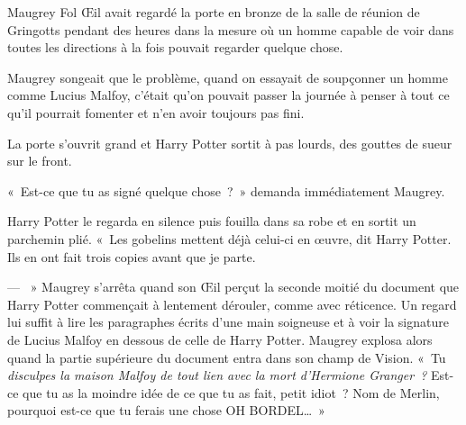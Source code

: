 \later

Maugrey Fol Œil avait regardé la porte en bronze de la salle de réunion de Gringotts pendant des heures dans la mesure où un homme capable de voir dans toutes les directions à la fois pouvait regarder quelque chose.

Maugrey songeait que le problème, quand on essayait de soupçonner un homme comme Lucius Malfoy, c'était qu'on pouvait passer la journée à penser à tout ce qu'il pourrait fomenter et n'en avoir toujours pas fini.

La porte s'ouvrit grand et Harry Potter sortit à pas lourds, des gouttes de sueur sur le front.

«~Est-ce que tu as signé quelque chose~?~» demanda immédiatement Maugrey.

Harry Potter le regarda en silence puis fouilla dans sa robe et en sortit un parchemin plié. «~Les gobelins mettent déjà celui-ci en œuvre, dit Harry Potter. Ils en ont fait trois copies avant que je parte.

--- ~» Maugrey s'arrêta quand son Œil perçut la seconde moitié du document que Harry Potter commençait à lentement dérouler, comme avec réticence. Un regard lui suffit à lire les paragraphes écrits d'une main soigneuse et à voir la signature de Lucius Malfoy en dessous de celle de Harry Potter. Maugrey explosa alors quand la partie supérieure du document entra dans son champ de Vision. «~Tu \emph{disculpes la maison Malfoy de tout lien avec la mort d'Hermione Granger~?} Est-ce que tu as la moindre idée de ce que tu as fait, petit idiot~? Nom de Merlin, pourquoi est-ce que tu ferais une chose OH BORDEL…~»
